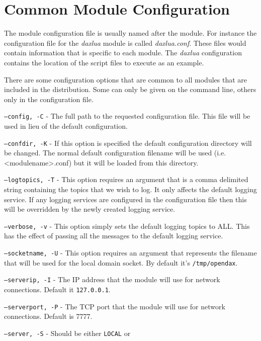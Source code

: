 	\section{Common Module Configuration}

	The module configuration file is usually named after the module.  For instance
	the configuration file for the \emph{daxlua} module is called
	\emph{daxlua.conf}.  These files would contain information that is specific to
	each module.  The \emph{daxlua} configuration contains the location of the
	script files to execute as an example.

	There are some configuration options that are common to all modules that are
	included in the distribution.  Some can only be given on the command line,
	others only in the configuration file.

	\begin{list}{}{Command Line Options}
		\item[\texttt{--config, -C}] - The full path to the requested configuration
		file.  This file will be used in lieu of the default configuration.
		\item[\texttt{--confdir, -K}] - If this option is specified the default
		configuration directory will be changed.  The normal default configuration
		filename will be used (i.e. <modulename>.conf) but it will be loaded from this
		directory.
		\item[\texttt{--logtopics, -T}] - This option requires an argument that is a
		comma delimited string containing the topics that we wish to log.  It only
		affects the default logging service.  If any logging services are configured in
		the configuration file then this will be overridden by the newly created logging
		service.
		\item[\texttt{--verbose, -v}] - This option simply sets the default logging
		topics to ALL.  This has the effect of passing all the messages to the default
		logging service.
		\item[\texttt{--socketname, -U}] - This option requires an argument that
		represents the filename that will be used for the local domain socket.  By
		default it's \texttt{/tmp/opendax}.
		\item[\texttt{--serverip, -I}] - The IP address that the module will use for
		network connections.  Default it \texttt{127.0.0.1}.
		\item[\texttt{--serverport, -P}] - The TCP port that the module will use for
		network connections.  Default is 7777.
		\item[\texttt{--server, -S}] - Should be either \texttt{LOCAL} or

\end{list}
